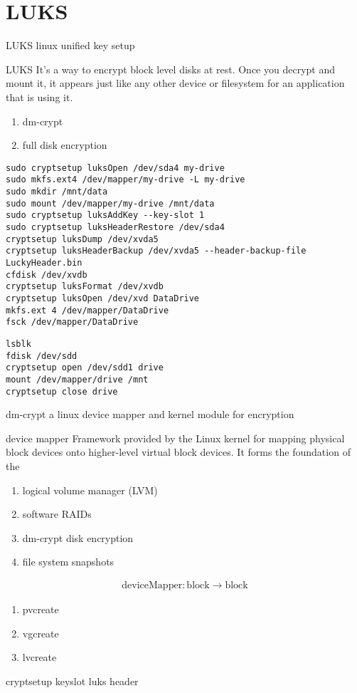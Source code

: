 \documentclass[openany, 12pt]{book}
\begin{document}
\chapter{LUKS}
\begin{definition}{LUKS}{}
	linux unified key setup
\end{definition}

\begin{intuition}{LUKS}{}
	It's a way to encrypt block level disks at rest. Once you decrypt and mount
	it, it appears just like any other device or filesystem for an application
	that is using it.
\end{intuition}

\begin{enumerate}[label = {(\arabic*)}]
	\item dm-crypt
	\item full disk encryption
\end{enumerate}

\begin{verbatim}
sudo cryptsetup luksOpen /dev/sda4 my-drive
sudo mkfs.ext4 /dev/mapper/my-drive -L my-drive
sudo mkdir /mnt/data
sudo mount /dev/mapper/my-drive /mnt/data
sudo cryptsetup luksAddKey --key-slot 1
sudo cryptsetup luksHeaderRestore /dev/sda4
cryptsetup luksDump /dev/xvda5
cryptsetup luksHeaderBackup /dev/xvda5 --header-backup-file LuckyHeader.bin
cfdisk /dev/xvdb
cryptsetup luksFormat /dev/xvdb
cryptsetup luksOpen /dev/xvd DataDrive
mkfs.ext 4 /dev/mapper/DataDrive
fsck /dev/mapper/DataDrive
\end{verbatim}

\begin{verbatim}
lsblk
fdisk /dev/sdd
cryptsetup open /dev/sdd1 drive
mount /dev/mapper/drive /mnt
cryptsetup close drive
\end{verbatim}

\begin{definition}{dm-crypt}{}
	a linux device mapper and kernel module for encryption
\end{definition}

\begin{definition}{device mapper}{}
	Framework provided by the Linux kernel for mapping physical block devices
	onto higher-level virtual block devices. It forms the foundation of the
	\begin{enumerate}[label = {(\arabic*)}]
		\item logical volume manager (LVM)
		\item software RAIDs
		\item dm-crypt disk encryption
		\item file system snapshots
	\end{enumerate}
	\begin{align*}
		\text{deviceMapper}: \text{block} \to \text{block}
	\end{align*}
\end{definition}

\begin{enumerate}[label = {(\arabic*)}]
	\item pvcreate
	\item vgcreate
	\item lvcreate
\end{enumerate}

cryptsetup
keyslot
luks header
\end{document}
